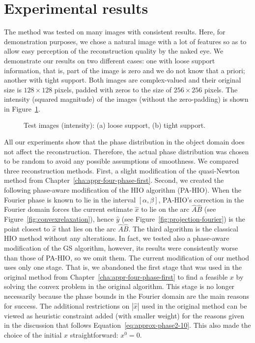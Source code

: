 \section{Experimental results}
\label{sec:approx-phase2-results}
The method was tested on many images with consistent results. Here,
for demonstration purposes, we chose a natural image with a lot of
features so as to allow easy perception of the reconstruction quality
by the naked eye. We demonstrate our results on two different cases: one
with loose support information, that is, part of the image is zero and
we do not know that a priori; another with tight support.  Both
images are complex-valued and their original size is $128\times128$
pixels, padded with zeros to the size of $256\times256$
pixels.  The intensity (squared magnitude) of the images (without the
zero-padding) is shown in
Figure~\ref{fig:lena-images}.


\begin{figure}[H]
  \centering
  \qquad{}
  \caption[Test images]{Test images (intensity): (a) loose support,
    (b) tight support.}
  \label{fig:lena-images}
\end{figure}
All our experiments show that the phase distribution in the object
domain does not affect the reconstruction. Therefore, the actual phase
distribution was chosen to be random to avoid any possible assumptions
of smoothness.  We compared three
reconstruction methods.  First, a slight modification of the
quasi-Newton method from Chapter~\ref{cha:appr-four-phase-first}.
Second, we created the following
phase-aware modification of the HIO algorithm (PA-HIO). When the
Fourier phase is known to lie in the interval $[\alpha,\beta]$,
PA-HIO's correction in the Fourier domain forces the current estimate
$\hat{x}$ to lie on the arc $\hat{A}\hat{B}$ (see
Figure~\ref{fig:convexrelaxation}), hence $\hat{y}$ (see
Figure~\ref{fig:projection-fourier}) is the point closest to $\hat{x}$
that lies on the arc $\hat{A}\hat{B}$. The third algorithm is the
classical HIO method without any alterations. In fact, we tested also
a phase-aware modification of the GS algorithm, however, its results were
consistently worse than those of PA-HIO, so we omit them.
The current modification of our method uses only one
stage. That is, we abandoned the first stage that was  used
in the original method from Chapter~\ref{cha:appr-four-phase-first} to
find a 
feasible $x$ by solving the convex problem in the original
algorithm. This stage is no longer necessarily because the phase
bounds in the Fourier domain are the main reasons for success. The
additional restrictions on $|\hat{x}|$ used in the original method can
be viewed as heuristic constraint added (with smaller weight) for the
reasons given in the discussion that follows
Equation~\eqref{eq:approx-phase2-10}. This also made the choice of the initial $x$
straightforward: $x^{0}=0$.


